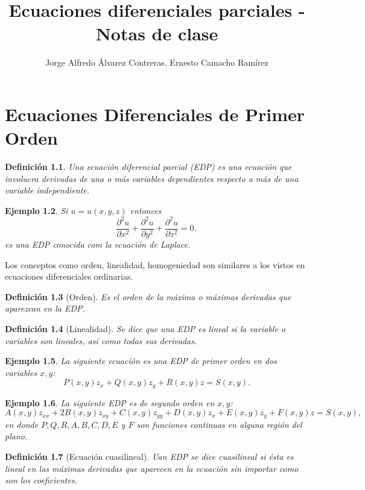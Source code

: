\documentclass[11pt,letterpaper]{report}
\title{Ecuaciones diferenciales parciales - Notas de clase}
\author{Jorge Alfredo Álvarez Contreras, Ernesto Camacho Ramírez}
\newtheorem{defn}{Definición}[chapter]
\newtheorem{example}[defn]{Ejemplo}
\newcommand\<{\langle}
\renewcommand\>{\rangle}
\begin{document}
\maketitle

\tableofcontents
\listoftodos

\chapter{Ecuaciones Diferenciales de Primer Orden}

\begin{defn}
  Una ecuación diferencial parcial (EDP) es una ecuación 
  que involucra derivadas de una o más variables dependientes 
  respecto a más de una variable independiente.
\end{defn}

\begin{example}
  Si $u = u(x,y,z)$ entonces
  \[
  \frac{\partial^2 u}{\partial x^2} + \frac{\partial^2 u}{\partial y^2} + \frac{\partial^2 u}{\partial z^2} = 0,
  \] es una EDP conocida com la ecuación de Laplace.
\end{example}

Los conceptos como orden, linealidad, homogeniedad son
similares a los vistos en ecuaciones diferenciales
ordinarias.

\begin{defn}[Orden]
  Es el orden de la máxima o máximas derivadas que aparezcan
  en la EDP.
\end{defn}

\begin{defn}[Linealidad]
  Se dice que una EDP es lineal si la variable o variables
  son \textit{lineales}, así como \textit{todas} sus
  derivadas.
\end{defn}

\begin{example}
  La siguiente ecuación es una EDP de primer orden en dos
  variables $x,y$:
  \[
    P(x,y) z_x + Q(x,y) z_y + R(x,y) z = S(x,y).
  \] 
\end{example}

\begin{example}
  La siguiente EDP es de segundo orden en $x,y$:
  \[
    A(x,y) z_{xx} + 2B(x,y) z_{xy} + C(x,y) z_{yy} + D(x,y)
    z_x + E(x,y) z_y + F(x,y) z = S(x,y),
  \] en donde $P,Q,R,A,B,C,D,E$ y $F$ son funciones
  continuas en alguna región del plano.
\end{example}

\begin{defn}[Ecuación cuasilineal]
  Uan EDP se dice cuasilineal si ésta es lineal en las
  máximas derivadas que aparecen en la ecuación sin importar
  como son los coeficientes.
\end{defn}
\end{document}
